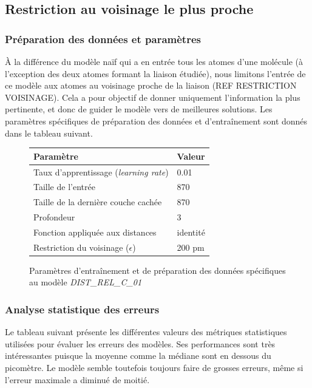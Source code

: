 \subsection{Restriction au voisinage le plus proche}

\subsubsection{Préparation des données et paramètres}
À la différence du modèle naïf qui a en entrée tous les atomes d'une molécule (à l'exception des deux atomes formant la liaison étudiée), nous limitons l'entrée de ce modèle aux atomes au voisinage proche de la liaison (REF RESTRICTION VOISINAGE). Cela a pour objectif de donner uniquement l'information la plus pertinente, et donc de guider le modèle vers de meilleures solutions. Les paramètres spécifiques de préparation des données et d'entraînement sont donnés dans le tableau suivant.

\begin{figure}[!h]
	\centering
	\begin{tabular}{|l|l|}
		\hline
		\textbf{Paramètre} & \textbf{Valeur} \\ \hline
		Taux d'apprentissage (\emph{learning rate}) & 0.01 \\ \hline
		Taille de l'entrée & 870 \\ \hline
		Taille de la dernière couche cachée & 870 \\ \hline
		Profondeur & 3 \\ \hline
		Fonction appliquée aux distances & identité \\ \hline
		Restriction du voisinage ($\epsilon$) & 200 pm \\ \hline
	\end{tabular}

	\caption{Paramètres d'entraînement et de préparation des données spécifiques au modèle \emph{DIST\_REL\_C\_01}}
\end{figure}

\subsubsection{Analyse statistique des erreurs}
\par Le tableau suivant présente les différentes valeurs des métriques statistiques utilisées pour évaluer les erreurs des modèles. Ses performances sont très intéressantes puisque la moyenne comme la médiane sont en dessous du picomètre. Le modèle semble toutefois toujours faire de grosses erreurs, même si l'erreur maximale a diminué de moitié.

